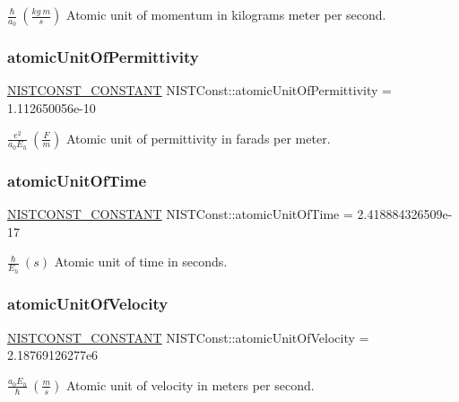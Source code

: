 $\frac{\hbar}{a_0} \ (\frac{kg\ m}{s})$ Atomic unit of momentum in kilograms meter per second. \mbox{\label{group___n_i_s_t_const-_atomic_unit_ga150ae2f35ef916113c6bcf612b7fa8c8}} 
\subsubsection{\texorpdfstring{atomic\+Unit\+Of\+Permittivity}{atomicUnitOfPermittivity}}
{\footnotesize\ttfamily \mbox{\hyperlink{group___n_i_s_t_const-_macros_ga2b0fc1d7452373f816175dd86ce26729}{N\+I\+S\+T\+C\+O\+N\+S\+T\+\_\+\+C\+O\+N\+S\+T\+A\+NT}} N\+I\+S\+T\+Const\+::atomic\+Unit\+Of\+Permittivity = 1.\+112650056e-\/10}

$\frac{e^2}{a_0 E_h} \ (\frac{F}{m})$ Atomic unit of permittivity in farads per meter. \mbox{\label{group___n_i_s_t_const-_atomic_unit_ga1dd9cd3a8f95c754529e663dc03d7b9e}} 
\subsubsection{\texorpdfstring{atomic\+Unit\+Of\+Time}{atomicUnitOfTime}}
{\footnotesize\ttfamily \mbox{\hyperlink{group___n_i_s_t_const-_macros_ga2b0fc1d7452373f816175dd86ce26729}{N\+I\+S\+T\+C\+O\+N\+S\+T\+\_\+\+C\+O\+N\+S\+T\+A\+NT}} N\+I\+S\+T\+Const\+::atomic\+Unit\+Of\+Time = 2.\+418884326509e-\/17}

$\frac{\hbar}{E_h} \ (s)$ Atomic unit of time in seconds. \mbox{\label{group___n_i_s_t_const-_atomic_unit_gaf53a1d1a7382eb03e12e980aeb34ded4}} 
\subsubsection{\texorpdfstring{atomic\+Unit\+Of\+Velocity}{atomicUnitOfVelocity}}
{\footnotesize\ttfamily \mbox{\hyperlink{group___n_i_s_t_const-_macros_ga2b0fc1d7452373f816175dd86ce26729}{N\+I\+S\+T\+C\+O\+N\+S\+T\+\_\+\+C\+O\+N\+S\+T\+A\+NT}} N\+I\+S\+T\+Const\+::atomic\+Unit\+Of\+Velocity = 2.\+18769126277e6}

$\frac{a_0 E_h}{\hbar} \ (\frac{m}{s})$ Atomic unit of velocity in meters per second. 